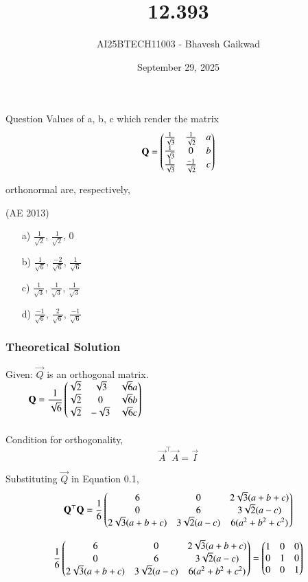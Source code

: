 \documentclass{beamer}
\title
{12.393}
\date{September 29, 2025}
\author 
{AI25BTECH11003 - Bhavesh Gaikwad}
\begin{document}
\frame{\titlepage}
\begin{frame}{Question}
Values of a, b, c which render the matrix $$\mathbf{Q} = \begin{pmatrix}\frac{1}{\sqrt{3}} & \frac{1}{\sqrt{2}} & a \\ 
\frac{1}{\sqrt{3}} & 0 & b \\
\frac{1}{\sqrt{3}} & \frac{-1}{\sqrt{2}} & c\end{pmatrix}$$

orthonormal are, respectively,

\hfill{(AE 2013)}
\begin{itemize}
    \item[a)]$\frac{1}{\sqrt{2}}$, $\frac{1}{\sqrt{2}}$, 0

    \item[b)]$\frac{1}{\sqrt{6}}$, $\frac{-2}{\sqrt{6}}$, $\frac{1}{\sqrt{6}}$

    \item[c)]$\frac{1}{\sqrt{3}}$, $\frac{1}{\sqrt{3}}$, $\frac{1}{\sqrt{3}}$

    \item[d)]$\frac{-1}{\sqrt{6}}$, $\frac{2}{\sqrt{6}}$, $\frac{-1}{\sqrt{6}}$
\end{itemize}
\end{frame}


\begin{frame}[fragile]
    \frametitle{Theoretical Solution}
Given: $\vec{Q}$ is an orthogonal matrix.\\
$\qquad$ $\mathbf{Q} = \dfrac{1}{\sqrt{6}}\begin{pmatrix}\sqrt{2} & \sqrt{3} & \sqrt{6}a \\ \sqrt{2} & 0 & \sqrt{6}b \\ \sqrt{2} & -\sqrt{3} & \sqrt{6}c\end{pmatrix}$\\\\

Condition for orthogonality,
\begin{equation}
    \vec{A}^\top\vec{A} = \vec{I}
\end{equation}

Substituting $\vec{Q}$ in Equation 0.1,
\begin{align}
\mathbf{Q}^\top\mathbf{Q} = \dfrac{1}{6} \begin{pmatrix}6 & 0 & 2\sqrt{3}(a+b+c) \\ 0 & 6 & 3\sqrt{2}(a-c) \\ 2\sqrt{3}(a+b+c) & 3\sqrt{2}(a-c) & 6(a^2 + b^2 + c^2)\end{pmatrix} 
\end{align}

\begin{equation}
    \dfrac{1}{6} \begin{pmatrix}6 & 0 & 2\sqrt{3}(a+b+c) \\ 0 & 6 & 3\sqrt{2}(a-c) \\ 2\sqrt{3}(a+b+c) & 3\sqrt{2}(a-c) & 6(a^2 + b^2 + c^2)\end{pmatrix} = \begin{pmatrix}1 & 0 & 0 \\ 0 & 1 & 0 \\ 0 & 0 & 1\end{pmatrix}
\end{equation}
\end{frame}
\end{document}
